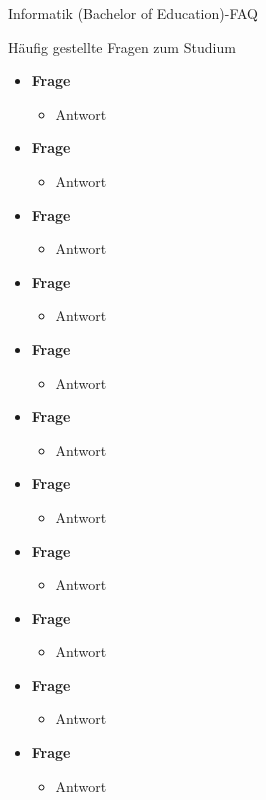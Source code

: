 \begin{Huge}
	Informatik (Bachelor of Education)-FAQ
\end{Huge}
\begin{block}{Häufig gestellte Fragen zum Studium}
\begin{large}
	\begin{itemize}
		\item \textbf{Frage} 
		\begin{itemize}
			\item Antwort
		\end{itemize}
	\item \textbf{Frage} 
	\begin{itemize}
		\item Antwort
	\end{itemize}
\item \textbf{Frage} 
\begin{itemize}
	\item Antwort
\end{itemize}
\item \textbf{Frage} 
\begin{itemize}
	\item Antwort
\end{itemize}
\item \textbf{Frage} 
\begin{itemize}
	\item Antwort
\end{itemize}
\item \textbf{Frage} 
\begin{itemize}
	\item Antwort
\end{itemize}
\item \textbf{Frage} 
\begin{itemize}
	\item Antwort
\end{itemize}
\item \textbf{Frage} 
\begin{itemize}
	\item Antwort
\end{itemize}
\item \textbf{Frage} 
\begin{itemize}
	\item Antwort
\end{itemize}
\item \textbf{Frage} 
\begin{itemize}
	\item Antwort
\end{itemize}
\item \textbf{Frage} 
\begin{itemize}
	\item Antwort
\end{itemize}
	\end{itemize}
\end{large}
\end{block}